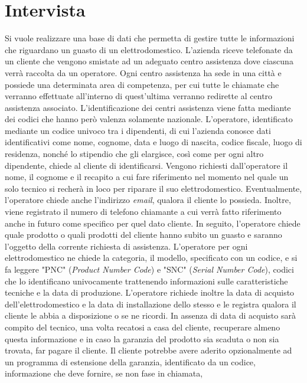 \documentclass[a4paper, 12pt]{report}
\begin{document}
\section{Intervista}
Si vuole realizzare una base di dati che permetta di gestire tutte le informazioni che riguardano un guasto di un elettrodomestico.
L'azienda riceve telefonate da un cliente che vengono smistate ad un adeguato centro assistenza dove ciascuna verrà raccolta da un operatore.
Ogni centro assistenza ha sede in una città e possiede una determinata area di competenza, per cui tutte le chiamate che verranno effettuate
all'interno di quest'ultima verranno redirette al centro assistenza associato. L'identificazione dei centri assistenza viene fatta mediante dei
codici che hanno però valenza solamente nazionale.\newline
L'operatore, identificato mediante un codice univoco tra i dipendenti, di cui l'azienda conosce dati identificativi come nome, cognome, data
e luogo di nascita, codice fiscale, luogo di residenza, nonché lo stipendio che gli elargisce, così come per ogni altro dipendente, chiede al 
cliente di identificarsi. Vengono richiesti dall'operatore 
il nome, il cognome e il recapito a cui fare riferimento nel momento nel quale un solo tecnico si recherà in loco per riparare il suo elettrodomestico. 
Eventualmente, l'operatore chiede anche l'indirizzo \textit{email}, qualora il cliente lo possieda. Inoltre, viene registrato il numero di telefono 
chiamante a cui verrà fatto riferimento anche in futuro come specifico per quel dato cliente.\newline
In seguito, l'operatore chiede quale prodotto o quali prodotti del cliente hanno subito un guasto e saranno l'oggetto della corrente richiesta di 
assistenza. L'operatore per ogni elettrodomestico ne chiede la categoria, il modello, specificato con un codice, e si fa leggere "PNC" (\textit{Product 
Number Code}) e "SNC" (\textit{Serial Number Code}), codici che lo identificano univocamente trattenendo informazioni sulle caratteristiche tecniche e
la data di produzione. L'operatore richiede inoltre la data di acquisto dell'elettrodomestico e la data di installazione dello stesso e le registra qualora 
il cliente le abbia a disposizione o se ne ricordi. In assenza di data di acquisto sarà compito del tecnico, una volta recatosi a casa del cliente, 
recuperare almeno questa informazione e in caso la garanzia del prodotto sia scaduta o non sia trovata, far pagare il cliente. Il cliente potrebbe avere 
aderito opzionalmente ad un programma di estensione della garanzia, identificato da un codice, informazione che deve fornire, se non fase in chiamata, 
\end{document}
